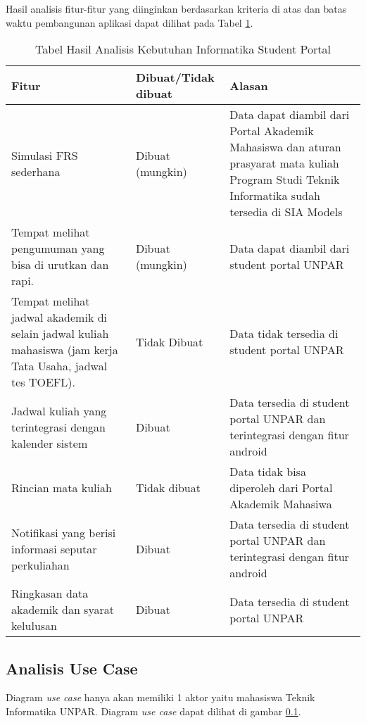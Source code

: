 Hasil analisis fitur-fitur yang diinginkan berdasarkan kriteria di atas dan batas waktu pembangunan aplikasi dapat dilihat pada Tabel \ref{tab:3_hasil_fitur}.
\begin{table}[H]
	\centering
		\caption{Tabel Hasil Analisis Kebutuhan Informatika Student Portal}
    \begin{tabular}{|p{4.5cm}|p{2.5cm}|p{8cm}|}
		\hline
		Fitur & Dibuat/Tidak dibuat & Alasan\\
		\hline
		Simulasi FRS sederhana                      & Dibuat (mungkin)       & Data dapat diambil dari Portal Akademik Mahasiswa dan aturan prasyarat mata kuliah Program Studi Teknik Informatika sudah tersedia di SIA Models                   \\
		\hline
    Tempat melihat pengumuman yang bisa di urutkan dan rapi.                               & Dibuat (mungkin)      & Data dapat diambil dari student portal UNPAR                       \\
		\hline
    Tempat melihat jadwal akademik di selain jadwal kuliah mahasiswa (jam kerja Tata Usaha, jadwal tes TOEFL).    & Tidak Dibuat       &  Data tidak tersedia di student portal UNPAR \\
		\hline
    Jadwal kuliah yang terintegrasi dengan kalender sistem                       & Dibuat       & Data tersedia di student portal UNPAR dan terintegrasi dengan fitur android                                                     \\
		\hline
    Rincian mata kuliah                               & Tidak dibuat & Data tidak bisa diperoleh dari Portal Akademik Mahasiwa                                               \\
		\hline
    Notifikasi yang berisi informasi seputar perkuliahan                                    & Dibuat & Data tersedia di student portal UNPAR dan terintegrasi dengan fitur android                                                                        \\
	    \hline
	    Ringkasan data akademik dan syarat kelulusan                                  & Dibuat & Data tersedia di student portal UNPAR                                                                       \\
	    \hline
		
		\end{tabular}
	\label{tab:3_hasil_fitur}
\end{table}
\subsection{Analisis Use Case}
Diagram \textit{use case} hanya akan memiliki 1 aktor yaitu mahasiswa Teknik Informatika UNPAR. Diagram \textit{use case} dapat dilihat di gambar \ref{}. 

